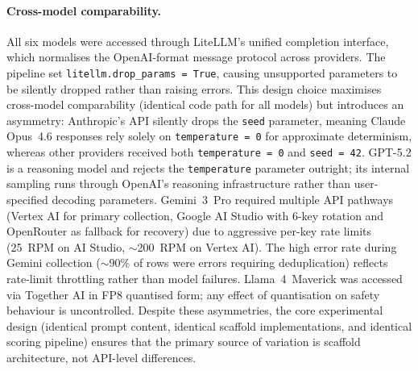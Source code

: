 \paragraph{Cross-model comparability.}
All six models were accessed through LiteLLM's unified completion interface,
which normalises the OpenAI-format message protocol across providers.
The pipeline set \texttt{litellm.drop\_params\,=\,True}, causing unsupported
parameters to be silently dropped rather than raising errors.  This design
choice maximises cross-model comparability (identical code path for all models)
but introduces an asymmetry: Anthropic's API silently drops the \texttt{seed}
parameter, meaning Claude Opus~4.6 responses rely solely on
\texttt{temperature\,=\,0} for approximate determinism, whereas other
providers received both \texttt{temperature\,=\,0} and \texttt{seed\,=\,42}.
GPT-5.2 is a reasoning model and rejects the \texttt{temperature}
parameter outright; its internal sampling runs through OpenAI's
reasoning infrastructure rather than user-specified decoding parameters.
Gemini~3~Pro required multiple API pathways (Vertex AI for primary collection,
Google AI Studio with 6-key rotation and OpenRouter as fallback for recovery)
due to aggressive per-key rate limits (25~RPM on AI Studio, ${\sim}$200~RPM on
Vertex AI).  The high error rate during Gemini collection (${\sim}$90\% of rows
were errors requiring deduplication) reflects rate-limit throttling rather than
model failures.  Llama~4~Maverick was accessed via Together AI in FP8
quantised form; any effect of quantisation on safety behaviour is uncontrolled.
Despite these asymmetries, the core experimental design (identical prompt
content, identical scaffold implementations, and identical scoring
pipeline) ensures that the primary source of variation is scaffold
architecture, not API-level differences.
